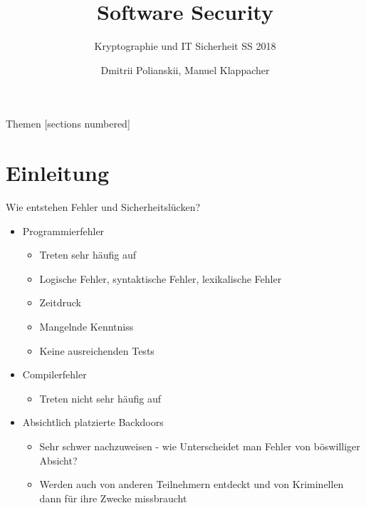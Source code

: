 \documentclass[10pt]{beamer}
\title{Software Security}
\subtitle{Kryptographie und IT Sicherheit SS 2018}
\date{}
\author{Dmitrii Polianskii, Manuel Klappacher}
\institute{Universit\"at Salzburg}
\begin{document}
\maketitle

\begin{frame}{Themen}
  [sections numbered]
  \tableofcontents
\end{frame}


\section{Einleitung}

\begin{frame}[fragile]{Wie entstehen Fehler und Sicherheitsl\"ucken?}
  \begin{itemize}
    \item Programmierfehler
      \begin{itemize}
        \item Treten sehr h\"aufig auf
        \item Logische Fehler, syntaktische Fehler, lexikalische Fehler
        \item Zeitdruck
        \item Mangelnde Kenntniss
        \item Keine ausreichenden Tests
      \end{itemize}
    \item Compilerfehler
      \begin{itemize}
        \item Treten nicht sehr h\"aufig auf
      \end{itemize}
    \item Absichtlich platzierte Backdoors
      \begin{itemize}
        \item Sehr schwer nachzuweisen - wie Unterscheidet man Fehler von b\"oswilliger Absicht?
        \item Werden auch von anderen Teilnehmern entdeckt und von Kriminellen dann f\"ur ihre Zwecke missbraucht
      \end{itemize}
  \end{itemize}
\end{frame}
\end{document}
